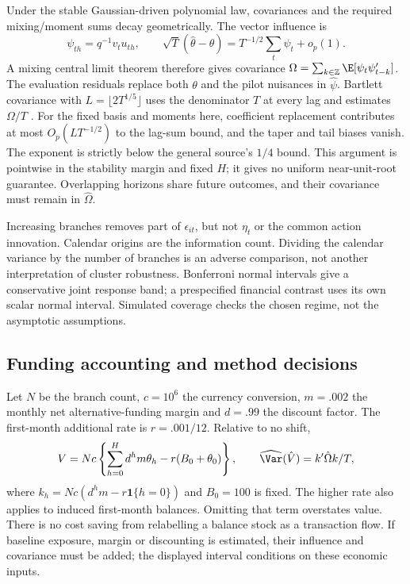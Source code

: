 Under the stable Gaussian-driven polynomial law, covariances and the
required mixing/moment sums decay geometrically. The vector influence is
\[
 \psi_{th}=q^{-1}v_tu_{th},\qquad
 \sqrt T(\hat\theta-\theta)
 =T^{-1/2}\sum_t\psi_t+o_p(1).
\]
A mixing central limit theorem therefore gives covariance
$\Omega=\sum_{k\in\mathbb Z}\E[\psi_t\psi_{t-k}']$.
The evaluation residuals replace both $\theta$ and the pilot nuisances in
$\hat\psi$. Bartlett covariance with
$L=\lfloor2T^{1/5}\rfloor$ uses the denominator $T$ at every lag and
estimates $\Omega/T$ \citep{newey1986}. For the fixed basis and moments
here, coefficient replacement contributes at most
$O_p(LT^{-1/2})$ to the lag-sum bound, and the taper and tail biases vanish.
The exponent is strictly below the general source's $1/4$ bound.
This argument is pointwise in the stability margin and fixed $H$; it gives
no uniform near-unit-root guarantee. Overlapping horizons share future
outcomes, and their covariance must remain in $\hat\Omega$.

Increasing branches removes part of $\epsilon_{it}$, but not $\eta_t$ or
the common action innovation. Calendar origins are the information count.
Dividing the calendar variance by the number of branches is an adverse
comparison, not another interpretation of cluster robustness. Bonferroni
normal intervals give a conservative joint response band; a prespecified
financial contrast uses its own scalar normal interval. Simulated coverage
checks the chosen regime, not the asymptotic assumptions.

\subsection{Funding accounting and method decisions}
Let $N$ be the branch count, $c=10^6$ the currency conversion, $m=.002$
the monthly net alternative-funding margin and $d=.99$ the discount factor.
The first-month additional rate is $r=.001/12$. Relative to no shift,
\begin{equation}
 V=Nc\left\{\sum_{h=0}^H d^h m\theta_h
                 -r(B_0+\theta_0)\right\},\qquad
 \widehat{\Var}(\hat V)=k'\hat\Omega k/T,
 \label{s6:funding-account}
\end{equation}
where $k_h=Nc(d^hm-r\mathbf1\{h=0\})$ and $B_0=100$ is fixed.
The higher rate also applies to induced first-month balances. Omitting that
term overstates value. There is no cost saving from relabelling a balance
stock as a transaction flow. If baseline exposure, margin or discounting is
estimated, their influence and covariance must be added; the displayed
interval conditions on these economic inputs.

